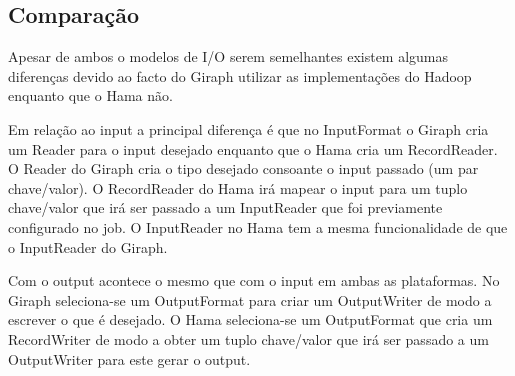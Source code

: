 
\subsection*{Comparação}

Apesar de ambos o modelos de I/O serem semelhantes existem algumas diferenças devido ao facto do Giraph utilizar as implementações 
do Hadoop enquanto que o Hama não. 

Em relação ao input a principal diferença é que no InputFormat o Giraph cria um Reader para o input desejado enquanto que 
o Hama cria um RecordReader. O Reader do Giraph cria o tipo desejado consoante o input passado (um par chave/valor). O RecordReader
do Hama irá mapear o input para um tuplo chave/valor que irá ser passado a um InputReader que foi previamente configurado no job. O InputReader
no Hama tem a mesma funcionalidade de que o InputReader do Giraph.

Com o output acontece o mesmo que com o input em ambas as plataformas. No Giraph seleciona-se um OutputFormat para criar um OutputWriter de modo
a escrever o que é desejado. O Hama seleciona-se um OutputFormat que cria um RecordWriter de modo a obter um tuplo chave/valor que irá ser
passado a um OutputWriter para este gerar o output.